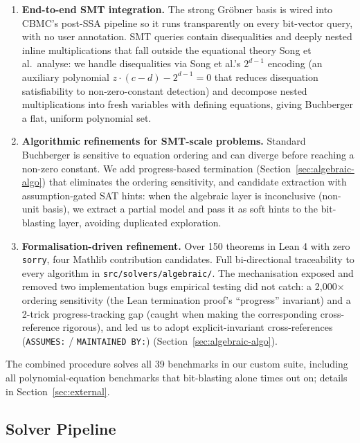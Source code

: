 \documentclass[runningheads]{llncs}
\newcommand{\cbmc}{\textsc{CBMC}\xspace}
\begin{document}
\begin{enumerate}
\item \textbf{End-to-end SMT integration.} The strong Gr\"obner
  basis is wired into \cbmc's post-SSA pipeline so it runs
  transparently on every bit-vector query, with no user
  annotation. SMT queries contain disequalities and deeply nested
  inline multiplications that fall outside the equational theory
  Song et al.\ analyse: we handle disequalities via Song et al.'s
  $2^{d-1}$ encoding (an auxiliary polynomial
  $z \cdot (c - d) - 2^{d-1} = 0$ that reduces disequation
  satisfiability to non-zero-constant detection) and decompose nested
  multiplications into fresh variables with defining equations,
  giving Buchberger a flat, uniform polynomial set.

\item \textbf{Algorithmic refinements for SMT-scale problems.}
  Standard Buchberger is sensitive to equation ordering and can
  diverge before reaching a non-zero constant. We add
  progress-based termination
  (Section~\ref{sec:algebraic-algo}) that eliminates the
  ordering sensitivity, and candidate extraction with
  assumption-gated SAT hints: when the algebraic layer is
  inconclusive (non-unit basis), we extract a partial model and
  pass it as soft hints to the bit-blasting layer, avoiding
  duplicated exploration.

\item \textbf{Formalisation-driven refinement.} Over 150 theorems in
  Lean 4 with zero \texttt{sorry}, four
  Mathlib contribution candidates. Full bi-directional
  traceability to every algorithm in
  \texttt{src/solvers/algebraic/}.
  The mechanisation exposed and removed two implementation bugs
  empirical testing did not catch: a 2{,}000$\times$ ordering
  sensitivity (the Lean termination proof's ``progress''
  invariant) and a 2-trick progress-tracking gap (caught when
  making the corresponding cross-reference rigorous), and led
  us to adopt explicit-invariant cross-references
  (\texttt{ASSUMES:} / \texttt{MAINTAINED BY:})
  (Section~\ref{sec:algebraic-algo}).
\end{enumerate}

The combined procedure solves all 39 benchmarks in our custom
suite, including all polynomial-equation benchmarks that
bit-blasting alone times out on; details in Section~\ref{sec:external}.

\subsection{Solver Pipeline}
\label{sec:algebraic-pipeline}
\end{document}
